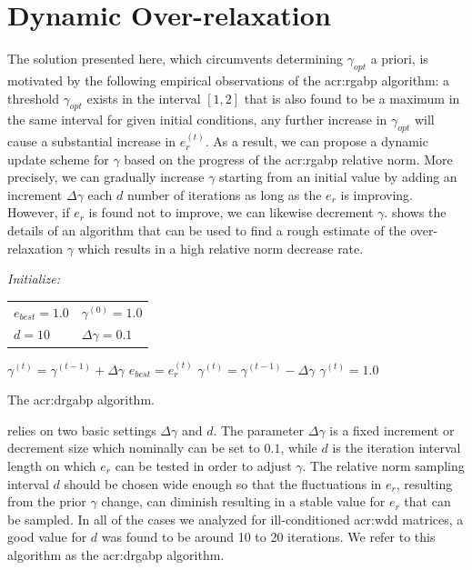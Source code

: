 \section{Dynamic Over-relaxation}
\label{sec:argabp}

The solution presented here, which circumvents determining $\gamma_{opt}$ a priori, is motivated by the following empirical observations of the \gls{acr:rgabp} algorithm: a threshold $\gamma_\mathit{opt}$ exists in the interval $[1,2]$ that is also found to be a maximum in the same interval for given initial conditions, any further increase in $\gamma_{opt}$ will cause a substantial increase in $ e_r^{(t)}$.
As a result, we can propose a dynamic update scheme for $\gamma$ based on the progress of the \gls{acr:rgabp} relative norm.
More precisely, we can gradually increase $\gamma$ starting from an initial value by adding an increment $\Delta\gamma$ each $d$ number of iterations as long as the $e_r$ is improving.
However, if $e_r$ is found not to improve, we can likewise decrement $\gamma$.
 shows the details of an algorithm that can be used to find a rough estimate of the over-relaxation $\gamma$ which results in a high relative norm decrease rate. 


\begin{algorithm}[h]
	\centering
	\begin{algorithmic}[1]
		\STATE \textit{Initialize:}\\
		\begin{tabular}{ll}
			$e_\mathit{best} = 1.0$ & $\gamma^{(0)}  = 1.0$\\ 
			$d  = 10$ & $\Delta\gamma  = 0.1$
		\end{tabular}
		\REPEAT[\gls{acr:pwgabp} iteration: $t=1,2,\cdots$]
		\STATE $\gamma^{(t)} = \gamma^{(t-1)} + \Delta\gamma$ 
		\STATE $e_\mathit{best} = e_r^{(t)}$
		\ELSE
		\STATE $\gamma^{(t)} = \gamma^{(t-1)} - \Delta\gamma$ 
		\STATE $\gamma^{(t)} = 1.0$
	\ENDIF
\ENDIF
\ENDIF
{}
\end{algorithmic}
\caption{The \gls{acr:drgabp} algorithm.}
\label{alg:gamma_update}
\end{algorithm}


 relies on two basic settings $\Delta \gamma$ and $d$.
The parameter $\Delta \gamma$ is a fixed increment or decrement size which nominally can be set to $0.1$, while $d$ is the iteration interval length on which $e_r$ can be tested in order to adjust $\gamma$.
The relative norm sampling interval $d$ should be chosen wide enough so that the fluctuations in $e_r$, resulting from the prior $\gamma$ change, can diminish resulting in a stable value for $e_r$ that can be sampled.
In all of the cases we analyzed for ill-conditioned \gls{acr:wdd} matrices, a good value for $d$ was found to be around 10 to 20 iterations.
We refer to this algorithm as the \gls{acr:drgabp} algorithm.


